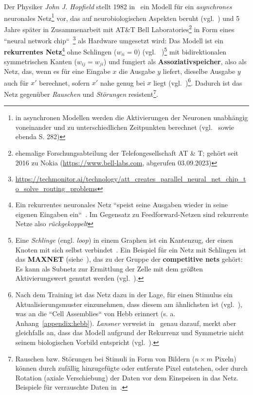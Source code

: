Der Physiker \textit{John J. Hopfield} stellt 1982 in~\cite{Hop82} ein Modell für ein \textit{asynchrones} neuronales Netz\footnote{
    in asynchronen Modellen werden die Aktivierungen der Neuronen unabhängig voneinander und zu unterschiedlichen Zeitpunkten berechnet (vgl.~\cite[49]{Roj93} sowie ebenda S. 282)
}  vor, das auf neurobiologischen Aspekten beruht (vgl.~\cite[2554]{Hop82}) und 5 Jahre später in Zusammenarbeit mit AT\&T Bell Laboratories\footnote{
    ehemalige Forschungsabteilung der Telefongesellschaft AT \& T;  gehört seit 2016 zu Nokia (\url{https://www.bell-labs.com}, abgerufen 03.09.2023)
} in Form eines ``neural network chip``~\cite[457]{AR88}\footnote{
    \url{https://techmonitor.ai/technology/att\_creates\_parallel\_neural\_net\_chip\_to\_solve\_routing\_problems}
} als Hardware umgesetzt wird: Das Modell ist ein \textbf{rekurrentes Netz}\footnote{
Ein rekurrentes neuronales Netz ``speist seine Ausgaben wieder in seine eigenen Eingaben ein``~\cite[847]{RN09}. Im Gegensatz zu Feedforward-Netzen sind rekurrente Netze also \textit{rückgekoppelt}
} ohne Schlingen ($w_{ii} = 0$) (vgl. ~\cite[291]{Ert21b})\footnote{ Eine \textit{Schlinge} (engl. \textit{loop}) in einem Graphen ist ein Kantenzug, der einen Knoten mit sich selbst verbindet~\cite[30]{Die17}. Ein Beispiel für ein Netz mit Schlingen ist das \textbf{MAXNET} (siehe~\cite{Lip87}), das zu der Gruppe der \textbf{competitive nets} gehört: Es kann als Subnetz zur Ermittlung der Zelle mit dem größten Aktivierungswert genutzt werden (vgl.~\cite[158 f.]{Fau94}).
} mit bidirektionalen symmetrischen Kanten ($w_{ij} = w_{ji}$) und fungiert als \textbf{Assoziativspeicher}, also als Netz, das, wenn es für eine Eingabe $x$ die Ausgabe $y$ liefert, dieselbe Ausgabe $y$ auch für $x'$ berechnet, sofern $x'$ nahe genug bei $x$ liegt (vgl.~\cite[251]{Roj93})\footnote{
    Nach dem Training ist das Netz dazu in der Lage, für einen Stimulus ein Aktualisierungsmuster einzunehmen, dass diesem am ähnlichsten ist (vgl.~\cite[882]{RN09}), was an die ``Cell Assemblies`` von Hebb erinnert (s. a. Anhang~\ref{appendix:hebb}). \textit{Lansner} verweist in~\cite[179]{Lan09} genau darauf, merkt aber gleichfalls an, dass das Modell aufgrund der Rekurrenz und Symmetrie nicht seinem biologischen Vorbild entspricht (vgl.~\cite[180]{Lan09}).
}. Dadurch ist das Netz gegenüber \textit{Rauschen} und \textit{Störungen} resistent\footnote{
    Rauschen bzw. Störungen bei Stimuli in Form von Bildern ($n \times m$ Pixeln) können durch zufällig hinzugefügte oder entfernte Pixel entstehen, oder durch Rotation (axiale Verschiebung) der Daten vor dem Einspeisen in das Netz. Beispiele für verrauschte Daten in~\cite[294]{Ert21b}.
}.

